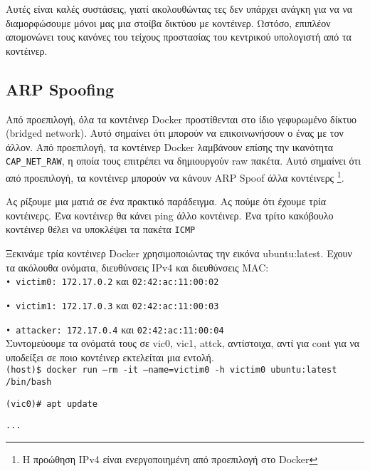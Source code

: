 Αυτές είναι καλές συστάσεις, γιατί ακολουθώντας τες δεν υπάρχει ανάγκη για να
να διαμορφώσουμε μόνοι μας μια στοίβα δικτύου με κοντέινερ. Ωστόσο, επιπλέον
απομονώνει τους κανόνες του τείχους προστασίας του κεντρικού υπολογιστή από τα
κοντέινερ.

\subsection{\textlatin{ARP Spoofing}}

Από προεπιλογή, όλα τα κοντέινερ \textlatin{Docker} προστίθενται στο ίδιο
γεφυρωμένο δίκτυο (\textlatin{bridged network}). Αυτό σημαίνει ότι μπορούν να
επικοινωνήσουν ο ένας με τον άλλον. Από προεπιλογή, τα κοντέινερ
\textlatin{Docker} λαμβάνουν επίσης την ικανότητα
\texttt{\textlatin{CAP\_NET\_RAW}}, η οποία τους επιτρέπει να δημιουργούν \textlatin{raw}
πακέτα. Αυτό σημαίνει ότι από προεπιλογή, τα κοντέινερ μπορούν να
κάνουν \textlatin{ARP Spoof} άλλα κοντέινερς \cite{Abusing-Containers}
\footnote{Η προώθηση \textlatin{IPv4} είναι ενεργοποιημένη από προεπιλογή στο \textlatin{Docker}}.

Ας ρίξουμε μια ματιά σε ένα πρακτικό παράδειγμα. Ας πούμε ότι έχουμε τρία
κοντέινερς. Ένα κοντέινερ θα κάνει \textlatin{ping} άλλο κοντέινερ. Ένα τρίτο
κακόβουλο κοντέινερ θέλει να υποκλέψει τα πακέτα \texttt{\textlatin{ICMP}}

Ξεκινάμε τρία κοντέινερ \textlatin{Docker} χρησιμοποιώντας την εικόνα
\textlatin{ubuntu:latest}. Εχουν τα ακόλουθα ονόματα, διευθύνσεις
\textlatin{IPv4} και διευθύνσεις \textlatin{MAC}: \\

\texttt{\textlatin{• victim0: 172.17.0.2}} και \texttt{\textlatin{02:42:ac:11:00:02}}

\texttt{\textlatin{• victim1: 172.17.0.3}} και \texttt{\textlatin{02:42:ac:11:00:03}}

\texttt{\textlatin{• attacker: 172.17.0.4}} και \texttt{\textlatin{02:42:ac:11:00:04}} \\

Συντομεύουμε τα ονόματά τους σε \textlatin{vic0, vic1, attck}, αντίστοιχα, αντί
για \textlatin{cont} για να υποδείξει σε ποιο κοντέινερ εκτελείται μια εντολή. \\

\texttt{\textlatin{(host)\$ docker run --rm -it --name=victim0 -h victim0 ubuntu:latest /bin/bash}}

\texttt{\textlatin{(vic0)\# apt update}}

\texttt{\textlatin{...}}


